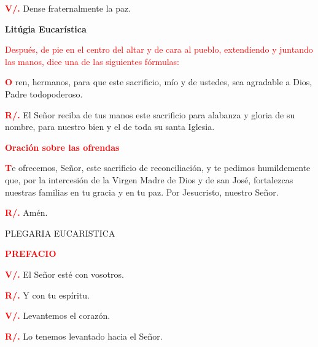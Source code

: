 \documentclass[12pt, letterpaper]{report}
\begin{document}
\noindent
\Large {\bfseries \textcolor{red}{V/.}} \hspace{0.5cm} Dense fraternalmente la paz. 

\begin{center}
\Huge {\bfseries Lit\'ugia Eucar\'istica}
\end{center}

\large {\textcolor{red}{Despu\'es, de pie en el centro del altar y de cara al pueblo, extendiendo y juntando las manos, dice una de las siguientes f\'ormulas:}}

\lettrine[lines=1]{\bfseries \textcolor{red}{O}}{} \Large ren, hermanos, para que este sacrificio, m\'io y de ustedes, sea agradable a Dios, Padre todopoderoso. 

\noindent
\Large {\bfseries \textcolor{red}{R/.}} \hspace{0.5cm} El Se\~nor reciba de tus manos este sacrificio para alabanza y gloria de su nombre, para nuestro bien y el de toda su santa Iglesia.

\Large {\bfseries \textcolor{red}{Oraci\'on sobre las ofrendas}}

\lettrine[lines=1]{\bfseries \textcolor{red}{T}}{}\Large e ofrecemos, Se\~nor, este sacrificio de reconciliaci\'on, y te pedimos humildemente que, por la intercesi\'on de la Virgen Madre de Dios y de san Jos\'e, fortalezcas nuestras familias en tu gracia y en tu paz. Por Jesucristo, nuestro Se\~nor.

\noindent
\Large {\bfseries \textcolor{red}{R/.}} \hspace{0.5cm} Am\'en.

\begin{center}
\Large PLEGARIA EUCARISTICA
\end{center}


\Large {\bfseries \textcolor{red}{PREFACIO}}

\noindent
\Large {\bfseries \textcolor{red}{V/.}} \hspace{0.5cm} El Se\~nor est\'e con vosotros.

\noindent
\Large {\bfseries \textcolor{red}{R/.}} \hspace{0.5cm} Y con tu esp\'iritu. 

\noindent
\Large {\bfseries \textcolor{red}{V/.}} \hspace{0.5cm} Levantemos el coraz\'on.

\noindent
\Large {\bfseries \textcolor{red}{R/.}} \hspace{0.5cm} Lo tenemos levantado hacia el Se\~nor. 
\end{document}
